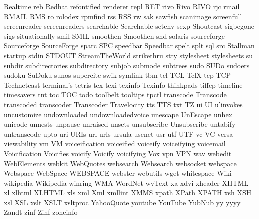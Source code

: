 Realtime
reb
Redhat
refontified
renderer
repl
RET
rivo
Rivo
RIVO
rjc
rmail
RMAIL
RMS
ro
rolodex
rpmfind
rss
RSS
rw
sak
sawfish
scanimage
screenfull
screenreader
screenreaders
searchable
Searchable
setenv
sexp
Shoutcast
sigbegone
sigs
situationally
smil
SMIL
smoothen
Smoothen
snd
solaris
sourceforge
Sourceforge
SourceForge
sparc
SPC
speedbar
Speedbar
spelt
splt
sql
src
Stallman
startup
stdin
STDOUT
StreamTheWorld
strikethru
stty
stylesheet
stylesheets
su
subdir
subdirectories
subdirectory
subjob
submode
subtrees
sudo
SUDo
sudoers
sudoku
SuDoku
sunos
supercite
swik
symlink
tbm
tcl
TCL
TclX
tcp
TCP
Technetcast
terminal's
tetris
tex
texi
texinfo
Texinfo
thinkpads
tiffcp
timeline
timesavers
tnt
toc
TOC
todo
toolbelt
tooltips
tpctl
transcode
Transcode
transcoded
transcoder
Transcoder
Travelocity
tts
TTS
txt
TZ
ui
UI
u'invokes
uncustomize
undownloaded
undownloadedvoice
unescape
UnEscape
unhex
unicode
unnests
unpause
unraised
unsets
unsubscribe
Unsubscribe
untabify
untranscode
upto
uri
URIs
url
urls
ursula
usenet
usr
utf
UTF
vc
VC
versa
viewability
vm
VM
voiceification
voiceified
voiceify
voiceifying
voicemail
Voicification
Voicifies
voicify
Voicify
voicifying
Vox
vpn
VPN
wav
webedit
WebElements
webkit
WebQuotes
websearch
Websearch
websocket
webspace
Webspace
WebSpace
WEBSPACE
webster
webutils
wget
whitespace
Wiki
wikipedia
Wikipedia
winring
WMA
WordNet
wvText
xa
xdvi
xheader
XHTML
xl
xlhtml
XLHTML
xls
xml
Xml
xmllint
XMMS
xpath
XPath
XPATH
xsh
XSH
xsl
XSL
xslt
XSLT
xsltproc
YahooQuote
youtube
YouTube
YubNub
yy
yyyy
Zandt
zinf
Zinf
zoneinfo
